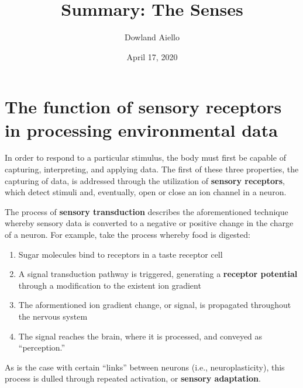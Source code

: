 \documentclass{article}
\begin{document}
\title{Summary: The Senses}
\author{Dowland Aiello}
\date{April 17, 2020}

\maketitle
\tableofcontents
\fancyhf{}

\newpage

\section{The function of sensory receptors in processing environmental data}

In order to respond to a particular stimulus, the body must first be capable of
capturing, interpreting, and applying data. The first of these three properties,
the capturing of data, is addressed through the utilization of \textbf{sensory
receptors}, which detect stimuli and, eventually, open or close an ion channel
in a neuron.

The process of \textbf{sensory transduction} describes the aforementioned
technique whereby sensory data is converted to a negative or positive
change in the charge of a neuron. For example, take the process whereby food
is digested:

\begin{enumerate}
	\item Sugar molecules bind to receptors in a taste receptor cell
	\item A signal transduction pathway is triggered, generating a
		\textbf{receptor potential} through a modification to the existent
		ion gradient
	\item The aformentioned ion gradient change, or signal, is propagated
		throughout the nervous system
	\item The signal reaches the brain, where it is processed, and conveyed as
		``perception.''
\end{enumerate}

As is the case with certain ``links'' between neurons (i.e., neuroplasticity),
this process is dulled through repeated activation, or \textbf{sensory
adaptation}.

\bigbreak{}
\end{document}
